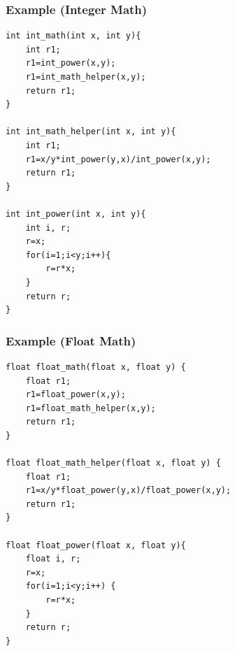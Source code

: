 \documentclass[aspectratio=43]{beamer}
\newenvironment{changemargin}[1]{%
  \begin{list}{}{%
    \setlength{\topsep}{0pt}%
    \setlength{\leftmargin}{#1}%
    \setlength{\rightmargin}{1em}
    \setlength{\listparindent}{\parindent}%
    \setlength{\itemindent}{\parindent}%
    \setlength{\parsep}{\parskip}%
  }%
  \item[]}{\end{list}}
\begin{document}
\begin{frame}[fragile]
  \frametitle{Example (Integer Math)}

  \begin{changemargin}{1.5cm}
  \begin{lstlisting}
int int_math(int x, int y){
    int r1;
    r1=int_power(x,y);
    r1=int_math_helper(x,y);
    return r1;
}

int int_math_helper(int x, int y){
    int r1;
    r1=x/y*int_power(y,x)/int_power(x,y);
    return r1;
}

int int_power(int x, int y){
    int i, r;
    r=x;
    for(i=1;i<y;i++){
        r=r*x;
    }
    return r;
}
  \end{lstlisting}
  \end{changemargin}
\end{frame}


\begin{frame}[fragile]
  \frametitle{Example (Float Math)}

  \begin{changemargin}{2cm}
  \begin{lstlisting}
float float_math(float x, float y) {
    float r1;
    r1=float_power(x,y);
    r1=float_math_helper(x,y);
    return r1;
}

float float_math_helper(float x, float y) {
    float r1;
    r1=x/y*float_power(y,x)/float_power(x,y);
    return r1;
}

float float_power(float x, float y){
    float i, r;
    r=x;
    for(i=1;i<y;i++) {
        r=r*x;
    }
    return r;
}
  \end{lstlisting}
  \end{changemargin}
\end{frame}
\end{document}
